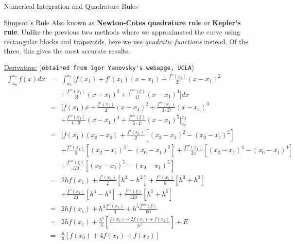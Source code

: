 \documentclass[11pt,titlepage,fleqn]{article}
\begin{document}
\begin{section}{Numerical Integration and Quadrature Rules}
\begin{subsection}{Simpson's Rule}
Also known as {\bf Newton-Cotes quadrature rule} or {\bf Kepler's rule}. Unlike the previous two methods where we approximated the curve using rectangular blocks and trapezoids, here we use {\it quadratic functions} instead. Of the three, this gives the most accurate results.

\underline{Derivation:} (\verb+obtained from Igor Yanovsky's webapge, UCLA+)
\begin{eqnarray*}
\int_{x_0}^{x_2} f(x) dx &=& \int_{x_0}^{x_2} [ f(x_1) + f'(x_1)(x - x_1) + \frac{f''(x_1)}{2!}(x - x_1)^2 \\
&&+ \frac{f'''(x_1)}{3!}(x - x_1)^3 + \frac{f''''(\xi)}{4!}(x - x_1)^4  ] dx \\
&=&  [ f(x_1)x + \frac{f'(x_1)}{2}(x - x_1)^2 + \frac{f''(x_1)}{3 \cdot 2!}(x - x_1)^3 \\
&& + \frac{f'''(x_1)}{4 \cdot .3!}(x - x_1)^4 + \frac{f''''(\xi)}{5\cdot4!}(x - x_1)^5  ]_{x_0}^{x_2}  \\
&=&  [ f(x_1)(x_2 - x_0) + \frac{f'(x_1)}{2}[(x_2 - x_1)^2 - (x_0 - x_1)^2] \\
&& + \frac{f''(x_1)}{6}[(x_2 - x_1)^3 - (x_0 - x_1)^3] + \frac{f'''(x_1)}{24}[(x_2 - x_1)^4 - (x_0 - x_1)^4] \\
&& + \frac{f''''(\xi)}{120}[(x_2 - x_1)^5 - (x_0 - x_1)^5] \\
&=& 2h f(x_1) + \frac{f'(x_1)}{2}[h^2 - h^2] + \frac{f''(x_1)}{6}[h^3 + h^3] \\
&& + \frac{f''(x_1)}{24}[h^4 - h^4] + \frac{f''''(\xi)}{120}[h^5 + h^5] \\
&=& 2h f(x_1) + h^3 \frac{f''(x_1)}{3} + h^5\frac{f''''(\xi)}{60} \\
&=& 2h f(x_1) + \frac{h^3}{3} \left [ \frac{f(x_0) - 2f(x_1) + f(x_2)}{h^2} \right ] + E \\
&=& \frac{h}{3} \left [ f(x_0) + 4f(x_1) + f(x_2)\right]
\end{eqnarray*}

\end{subsection}
\end{section}
\end{document}

